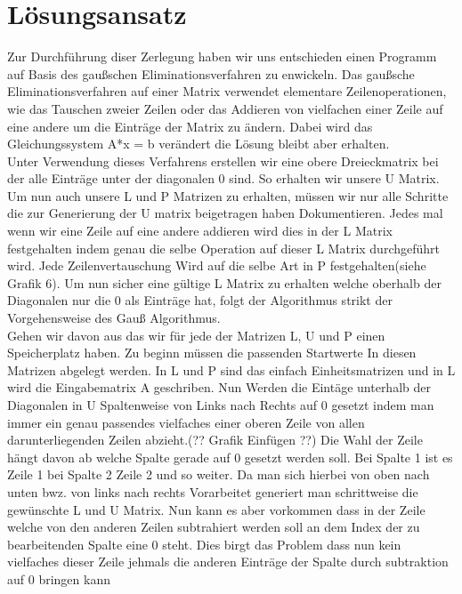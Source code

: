 \documentclass[course=erap]{aspdoc}
\begin{document}
\section{Lösungsansatz}
\noindent\hspace*{15mm}%
Zur Durchführung diser Zerlegung haben wir uns entschieden einen Programm auf Basis des gaußschen Eliminationsverfahren zu enwickeln.
 Das gaußsche Eliminationsverfahren auf einer Matrix verwendet elementare Zeilenoperationen, wie das Tauschen zweier Zeilen oder das Addieren von vielfachen einer Zeile auf eine andere
 um die Einträge der Matrix zu ändern. Dabei wird das Gleichungssystem A*x = b verändert die Lösung bleibt aber erhalten.\\
\noindent\hspace*{15mm}%
Unter Verwendung dieses Verfahrens erstellen wir eine obere Dreieckmatrix bei der alle Einträge unter der 
diagonalen 0 sind. So erhalten wir unsere U Matrix. Um nun auch unsere L und P Matrizen zu erhalten, müssen
wir nur alle Schritte die zur Generierung der U matrix beigetragen haben Dokumentieren. Jedes mal wenn wir eine Zeile auf eine andere addieren
wird dies in der L Matrix festgehalten indem genau die selbe Operation auf dieser L Matrix durchgeführt wird. Jede Zeilenvertauschung Wird auf die selbe Art in P festgehalten(siehe Grafik 6).  
Um nun sicher eine gültige L Matrix zu erhalten welche oberhalb der Diagonalen nur die 0 als Einträge hat, folgt der Algorithmus strikt der Vorgehensweise des Gauß Algorithmus.\\
\noindent\hspace*{15mm}%
 Gehen wir davon aus das wir für jede der Matrizen L, U und P einen Speicherplatz haben.
Zu beginn müssen die passenden Startwerte In diesen Matrizen abgelegt werden. In L und P sind das einfach Einheitsmatrizen und in L wird die Eingabematrix A geschriben. Nun Werden die Eintäge unterhalb der Diagonalen in U  
Spaltenweise von Links nach Rechts auf 0 gesetzt indem man immer ein genau passendes vielfaches einer oberen Zeile von allen darunterliegenden 
Zeilen abzieht.(?? Grafik Einfügen ??) Die Wahl der Zeile hängt davon ab welche Spalte gerade auf 0 gesetzt werden soll. 
Bei Spalte 1 ist es Zeile 1 bei Spalte 2 Zeile 2 und so weiter. Da man sich hierbei von oben nach unten bwz. von links nach rechts Vorarbeitet generiert man schrittweise
die gewünschte L und U Matrix. Nun kann es aber vorkommen dass in der Zeile welche von den anderen Zeilen subtrahiert werden soll an dem Index der zu bearbeitenden
Spalte eine 0 steht. Dies birgt das Problem dass nun kein vielfaches dieser Zeile jehmals die anderen Einträge der Spalte durch subtraktion auf 0 bringen kann
\end{document}
